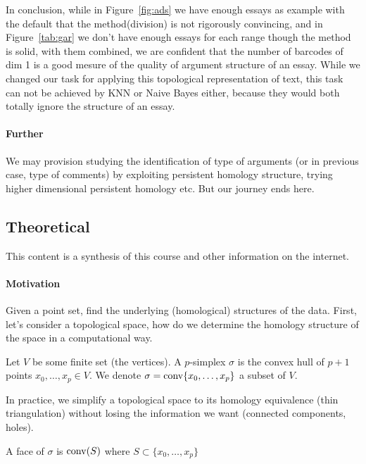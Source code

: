 In conclusion, while in Figure~\ref{fig:ads} we have enough essays as example with the default that
the method(division) is not rigorously convincing, and in Figure~\ref{tab:gar} we don't
have enough essays for each range though the method is solid, with them combined,
we are confident that the number of barcodes of dim 1 is a good mesure of the quality of
argument structure of an essay. While we changed our task for applying
this topological representation of text, this task can not be achieved by
KNN or Naive Bayes either, because they would both totally ignore
the structure of an essay.

\paragraph{Further} We may provision studying the identification of type
of arguments (or in previous case, type of comments) by exploiting persistent homology structure,
trying higher dimensional persistent homology etc. But our journey ends here.

\subsection{Theoretical}
\label{theoretical}

This content is a synthesis of this course\cite{INF556} and other
information on the internet.

\paragraph{Motivation} Given a point set, find the underlying (homological) structures of
the data. First, let's consider a topological space, how do we determine
the homology structure of the space in a computational way.

\begin{definition}[$p$-simplex ($p\in\N$)]
  Let $V$ be some finite set (the vertices).
  A $p$-simplex $\sigma$ is the convex hull of $p+1$
  points $x_0, \ldots, x_p \in V$.
  We denote $\sigma = \operatorname{conv}\{x_0, \ldots, x_p\}$ a subset of $V$.
\end{definition}
\RM In practice, we simplify a topological space to its homology equivalence (thin
triangulation) without
losing the information we want (connected components, holes).

\begin{definition}[Face]
  A face of $\sigma$ is $\operatorname{conv}(S)$ where $S\subset\{x_0,\ldots, x_p\}$
\end{definition}

